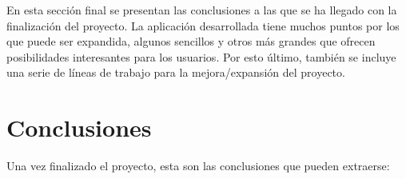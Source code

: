 
En esta sección final se presentan las conclusiones a las que se ha llegado con
la finalización del proyecto. La aplicación desarrollada tiene muchos puntos por
los que puede ser expandida, algunos sencillos y otros más grandes que ofrecen
posibilidades interesantes para los usuarios. Por esto último, también se
incluye una serie de líneas de trabajo para la mejora/expansión del proyecto.

\section{Conclusiones}

Una vez finalizado el proyecto, esta son las conclusiones que pueden extraerse:


